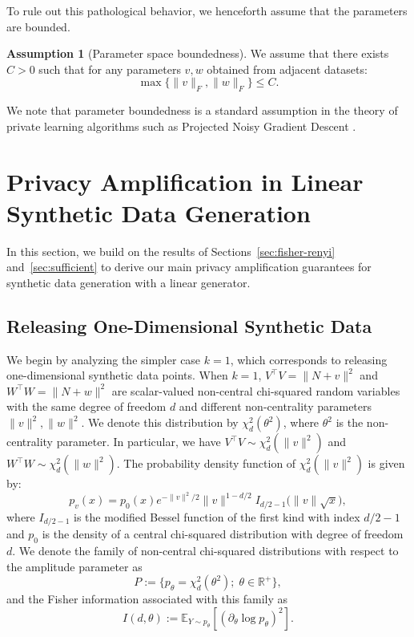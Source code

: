 \documentclass{article}
\theoremstyle{plain}
\theoremstyle{definition}
\newtheorem{assumption}[theorem]{Assumption}
\theoremstyle{remark}
\begin{document}
To rule out this pathological behavior, we henceforth assume that the parameters are bounded.
\begin{assumption}[Parameter space boundedness]
    We assume that there exists $C > 0$ such that for any parameters $v,w$ obtained from adjacent datasets: \[\max\{\|v\|_F,\|w\|_F\} \leq C.\]
\end{assumption}
We note that parameter boundedness is a standard assumption in the theory of private learning algorithms such as Projected Noisy Gradient Descent \citep{Feldman2018,Altschuler2022}.




\section{Privacy Amplification in Linear Synthetic Data Generation}

In this section, we build on the results of Sections~\ref{sec:fisher-renyi} and~\ref{sec:sufficient} to derive our main privacy amplification guarantees for synthetic data generation with a linear generator.

\subsection{Releasing One-Dimensional Synthetic Data}
\label{sec:linear-regression}

We begin by analyzing the simpler case $k = 1$, which corresponds to releasing one-dimensional synthetic data points.
When $k=1$, $V^\top V= \|N+v\|^2$ and $W^\top W=\|N+w\|^2$ are scalar-valued non-central chi-squared random variables with the same degree of freedom $d$ and different non-centrality parameters $\|v\|^2,\|w\|^2$. We denote this distribution by $\chi_d^2(\theta^2)$, where $\theta^2$ is the non-centrality parameter. In particular, we have $V^\top V \sim \chi_d^2(\|v\|^2)$ and $W^\top W \sim \chi_d^2(\|w\|^2)$. The probability density function of $\chi_d^2(\|v\|^2)$ is given by:
\[p_v(x) = p_0(x)e^{- \|v\|^2/2} \|v\|^{1-d/2} I_{d/2-1}\big(\|v\| \sqrt{x}\big),\]
where $I_{d/2-1}$ is the modified Bessel function of the first kind with index $d/2-1$ and $p_0$ is the density of a central chi-squared distribution with degree of freedom $d$. We denote the family of non-central chi-squared distributions with respect to the amplitude parameter as \[P := \{p_\theta= \chi_d^2(\theta^2); \; \theta \in \mathbb{R^+}\},\] and the Fisher information associated with this family as $$I(d,\theta) := \mathbb{E}_{Y \sim p_\theta}[(\partial_\theta \log p_\theta)^2].$$
\end{document}
